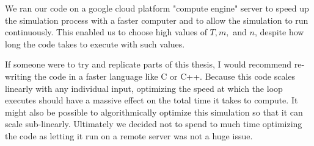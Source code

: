 \documentclass[12pt,twoside]{reedthesis}
\begin{document}
      We ran our code on a google cloud platform "compute engine" server to speed up the simulation process with a faster computer and to allow the simulation to run continuously. This enabled us to choose high values of $T, m,$ and $n$, despite how long the code takes to execute with such values.  
      
      If someone were to try and replicate parts of this thesis, I would recommend re-writing the code in a faster language like C or C++. Because this code scales linearly with any individual input, optimizing the speed at which the loop executes should have a massive effect on the total time it takes to compute. It might also be possible to algorithmically optimize this simulation so that it can scale sub-linearly. Ultimately we decided not to spend to much time optimizing the code as letting it run on a remote server was not a huge issue.
      


  \backmatter %

    \nocite{*}


%  
 

\end{document}
